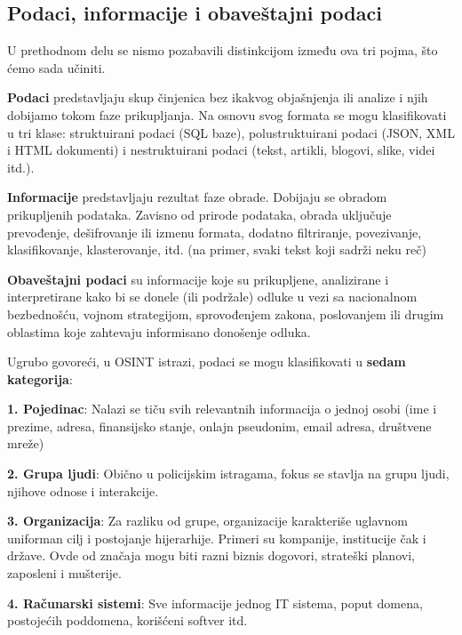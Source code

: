 \documentclass[fleqn, 12pt]{article}
\begin{document}
\subsection{Podaci, informacije i obaveštajni podaci}
U prethodnom delu se nismo pozabavili distinkcijom između ova tri pojma, što ćemo sada učiniti.\newline

{\bf Podaci} predstavljaju skup činjenica bez ikakvog objašnjenja ili analize i njih dobijamo tokom faze prikupljanja. Na osnovu svog formata se mogu klasifikovati u tri klase: struktuirani podaci (SQL baze), polustruktuirani podaci (JSON, XML i HTML dokumenti) i nestruktuirani podaci (tekst, artikli, blogovi, slike, videi itd.).\newline

{\bf Informacije} predstavljaju rezultat faze obrade. Dobijaju se obradom prikupljenih podataka. Zavisno od prirode podataka, obrada uključuje prevođenje, dešifrovanje ili izmenu formata, dodatno filtriranje, povezivanje, klasifikovanje, klasterovanje, itd. (na primer, svaki tekst koji sadrži neku reč)\newline

{\bf Obaveštajni podaci} su informacije koje su prikupljene, analizirane i interpretirane kako bi se donele (ili podržale) odluke u vezi sa nacionalnom bezbednošću, vojnom strategijom, sprovođenjem zakona, poslovanjem ili drugim oblastima koje zahtevaju informisano donošenje odluka. \newline

Ugrubo govoreći, u OSINT istrazi, podaci se mogu klasifikovati u {\bf sedam kategorija}:\newline

{\bf 1. Pojedinac}: Nalazi se tiču svih relevantnih informacija o jednoj osobi (ime i prezime, adresa, finansijsko stanje, onlajn pseudonim, email adresa, društvene mreže)\newline

{\bf 2. Grupa ljudi}: Obično u policijskim istragama, fokus se stavlja na grupu ljudi, njihove odnose i interakcije.\newline

{\bf 3. Organizacija}: Za razliku od grupe, organizacije karakteriše uglavnom uniforman cilj i postojanje hijerarhije. Primeri su kompanije, institucije čak i države. Ovde od značaja mogu biti razni biznis dogovori, strateški planovi, zaposleni i mušterije.\newline

{\bf 4. Računarski sistemi}: Sve informacije jednog IT sistema, poput domena, postojećih  poddomena, korišćeni softver itd.\newline
\end{document}
